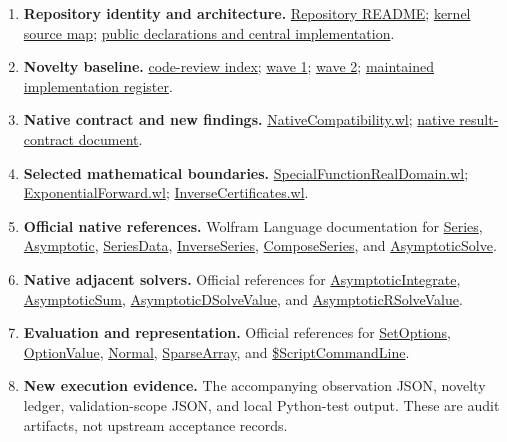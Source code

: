 \documentclass[11pt]{article}
\newcommand{\repo}{https://github.com/VladimirReshetnikov/Asymptotic/blob/6687962f3c858a4f93623cfc496f33e35c6763d4/}
\begin{document}
\begin{enumerate}[leftmargin=*,itemsep=5pt]
\item \textbf{Repository identity and architecture.} \href{\repo README.md}{Repository README}; \href{\repo src/Kernel/README.md}{kernel source map}; \href{\repo src/Kernel/AsymptoticAnalysis.wl}{public declarations and central implementation}.
\item \textbf{Novelty baseline.} \href{\repo external-reports/code-review/README.md}{code-review index}; \href{\repo external-reports/code-review/wave-1/README.md}{wave 1}; \href{\repo external-reports/code-review/wave-2/README.md}{wave 2}; \href{\repo docs/development/CODE_REVIEW_STATUS.md}{maintained implementation register}.
\item \textbf{Native contract and new findings.} \href{\repo src/Kernel/NativeCompatibility.wl}{NativeCompatibility.wl}; \href{\repo docs/development/NATIVE_RESULT_CONTRACTS.md}{native result-contract document}.
\item \textbf{Selected mathematical boundaries.} \href{\repo src/Kernel/SpecialFunctionRealDomain.wl}{SpecialFunctionRealDomain.wl}; \href{\repo src/Kernel/ExponentialForward.wl}{ExponentialForward.wl}; \href{\repo src/Kernel/InverseCertificates.wl}{InverseCertificates.wl}.
\item \textbf{Official native references.} Wolfram Language documentation for \href{https://reference.wolfram.com/language/ref/Series.html}{Series}, \href{https://reference.wolfram.com/language/ref/Asymptotic.html}{Asymptotic}, \href{https://reference.wolfram.com/language/ref/SeriesData.html}{SeriesData}, \href{https://reference.wolfram.com/language/ref/InverseSeries.html}{InverseSeries}, \href{https://reference.wolfram.com/language/ref/ComposeSeries.html}{ComposeSeries}, and \href{https://reference.wolfram.com/language/ref/AsymptoticSolve.html}{AsymptoticSolve}.
\item \textbf{Native adjacent solvers.} Official references for \href{https://reference.wolfram.com/language/ref/AsymptoticIntegrate.html}{AsymptoticIntegrate}, \href{https://reference.wolfram.com/language/ref/AsymptoticSum.html}{AsymptoticSum}, \href{https://reference.wolfram.com/language/ref/AsymptoticDSolveValue.html}{AsymptoticDSolveValue}, and \href{https://reference.wolfram.com/language/ref/AsymptoticRSolveValue.html}{AsymptoticRSolveValue}.
\item \textbf{Evaluation and representation.} Official references for \href{https://reference.wolfram.com/language/ref/SetOptions.html}{SetOptions}, \href{https://reference.wolfram.com/language/ref/OptionValue.html}{OptionValue}, \href{https://reference.wolfram.com/language/ref/Normal.html}{Normal}, \href{https://reference.wolfram.com/language/ref/SparseArray.html}{SparseArray}, and \href{https://reference.wolfram.com/language/ref/\%24ScriptCommandLine.html}{\$ScriptCommandLine}.
\item \textbf{New execution evidence.} The accompanying observation JSON, novelty ledger, validation-scope JSON, and local Python-test output. These are audit artifacts, not upstream acceptance records.
\end{enumerate}
\end{document}
